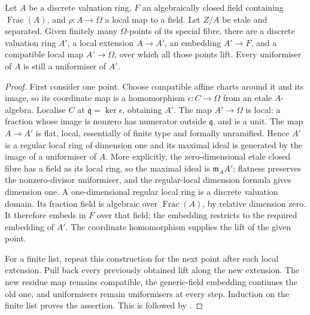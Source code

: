 \begin{srlemma}
\label{lem:psi-etale-finite-lifts}
Let \(A\) be a discrete valuation ring, \(F\) an algebraically closed
field containing \(\operatorname{Frac}(A)\), and
\(\rho:A\to\Omega\) a local map to a field.
Let \(Z/A\) be etale and separated.  Given finitely many
\(\Omega\)-points of its special fibre, there are a discrete valuation
ring \(A'\), a local extension \(A\to A'\), an embedding \(A'\to F\),
and a compatible local map \(A'\to\Omega\), over which all those
points lift.  Every uniformiser of \(A\) is still a uniformiser of
\(A'\).
\end{srlemma}
\begin{proof}
First consider one point.  Choose compatible affine charts around it
and its image, so its coordinate map is a homomorphism
\(\epsilon:C\to\Omega\) from an etale \(A\)-algebra.
Localise \(C\) at \(\mathfrak q=\ker\epsilon\), obtaining \(A'\).
The map \(A'\to\Omega\) is local: a fraction whose image is nonzero
has numerator outside \(\mathfrak q\), and is a unit.
The map \(A\to A'\) is flat, local, essentially of finite type and
formally unramified.  Hence \(A'\) is a regular local ring of dimension
one and its maximal ideal is generated by the image of a uniformiser
of \(A\).  More explicitly, the zero-dimensional etale closed fibre
has a field as its local ring, so the maximal ideal is
\(\mathfrak m_AA'\); flatness preserves the nonzero-divisor
uniformiser, and the regular-local dimension formula gives dimension
one.  A one-dimensional regular local ring is a discrete valuation
domain.  Its fraction field is algebraic over
\(\operatorname{Frac}(A)\), by relative dimension zero.
It therefore embeds in \(F\) over that field; the embedding restricts
to the required embedding of \(A'\).
The coordinate homomorphism supplies the lift of the given point.

For a finite list, repeat this construction for the next point after
each local extension.  Pull back every previously obtained lift along
the new extension.  The new residue map remains compatible, the
generic-field embedding continues the old one, and uniformisers
remain uniformisers at every step.  Induction on the finite list
proves the assertion.  This is
 followed by .
\end{proof}

